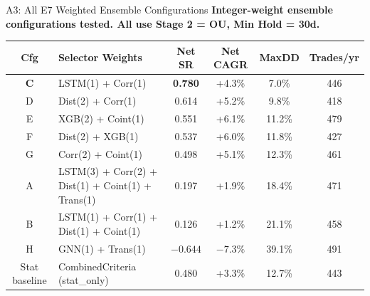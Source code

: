 \documentclass[aspectratio=169,10pt]{beamer}
\begin{document}
\begin{frame}{A3: All E7 Weighted Ensemble Configurations}
  \small\textbf{Integer-weight ensemble configurations tested. All use Stage 2 = OU, Min Hold = 30d.}
  \vspace{4pt}
  \centering\scriptsize\renewcommand{\arraystretch}{1.3}
  \begin{tabular}{c>{\raggedright}p{5.5cm}cccc}
    \toprule
    \textbf{Cfg} & \textbf{Selector Weights} & \textbf{Net SR} & \textbf{Net CAGR} & \textbf{MaxDD} & \textbf{Trades/yr} \\
    \midrule
    \rowcolor{hlrow}\textbf{C} & LSTM(1) + Corr(1)
          & \color{goodgreen}\textbf{0.780} & +4.3\% & 7.0\%  & 446 \\
    D & Dist(2) + Corr(1)
          & \color{goodgreen}0.614 & +5.2\% & 9.8\%  & 418 \\
    E & XGB(2) + Coint(1)
          & \color{goodgreen}0.551 & +6.1\% & 11.2\% & 479 \\
    F & Dist(2) + XGB(1)
          & \color{goodgreen}0.537 & +6.0\% & 11.8\% & 427 \\
    G & Corr(2) + Coint(1)
          & \color{goodgreen}0.498 & +5.1\% & 12.3\% & 461 \\
    A & LSTM(3) + Corr(2) + Dist(1) + Coint(1) + Trans(1)
          & 0.197 & +1.9\% & 18.4\% & 471 \\
    B & LSTM(1) + Corr(1) + Dist(1) + Coint(1)
          & 0.126 & +1.2\% & 21.1\% & 458 \\
    H & GNN(1) + Trans(1)
          & \color{badred}$-0.644$ & $-7.3\%$ & 39.1\% & 491 \\
    \midrule
    Stat baseline & CombinedCriteria (stat\_only)
          & 0.480 & +3.3\% & 12.7\% & 443 \\
    \bottomrule
  \end{tabular}
\end{frame}
\end{document}
